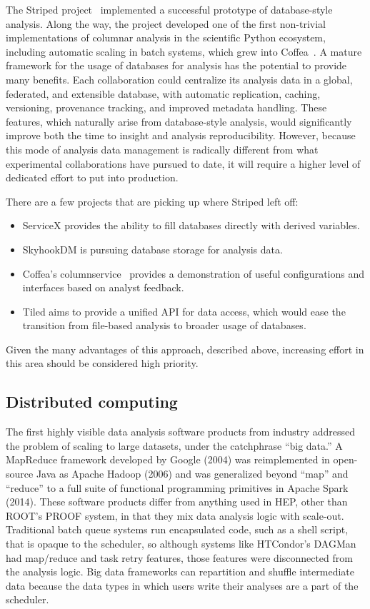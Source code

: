 \documentclass{article}
\begin{document}
The Striped project~\cite{Chang:2017ske,Gutsche:2020kmd} implemented a successful prototype of database-style analysis. Along the way, the project developed one of the first non-trivial implementations of columnar analysis in the scientific Python ecosystem, including automatic scaling in batch systems, which grew into Coffea~\cite{Smith:2020pxs}. A mature framework for the usage of databases for analysis has the potential to provide many benefits. Each collaboration could centralize its analysis data in a global, federated, and extensible database, with automatic replication, caching, versioning, provenance tracking, and improved metadata handling. These features, which naturally arise from database-style analysis, would significantly improve both the time to insight and analysis reproducibility. However, because this mode of analysis data management is radically different from what experimental collaborations have pursued to date, it will require a higher level of dedicated effort to put into production.

There are a few projects that are picking up where Striped left off:

\begin{itemize}
\item{ServiceX provides the ability to fill databases directly with derived variables.}
\item{SkyhookDM is pursuing database storage for analysis data.}
\item{Coffea's columnservice~\cite{columnservice} provides a demonstration of useful configurations and interfaces based on analyst feedback.}
\item{Tiled aims to provide a unified API for data access, which would ease the transition from file-based analysis to broader usage of databases.}
\end{itemize}

Given the many advantages of this approach, described above, increasing effort in this area should be considered high priority.

\subsection{Distributed computing}

The first highly visible data analysis software products from industry addressed the problem of scaling to large datasets, under the catchphrase ``big data.'' A MapReduce framework developed by Google (2004) was reimplemented in open-source Java as Apache Hadoop (2006) and was generalized beyond ``map'' and ``reduce'' to a full suite of functional programming primitives in Apache Spark (2014). These software products differ from anything used in HEP, other than ROOT's PROOF system, in that they mix data analysis logic with scale-out. Traditional batch queue systems run encapsulated code, such as a shell script, that is opaque to the scheduler, so although systems like HTCondor's DAGMan had map/reduce and task retry features, those features were disconnected from the analysis logic. Big data frameworks can repartition and shuffle intermediate data because the data types in which users write their analyses are a part of the scheduler. 
\end{document}
